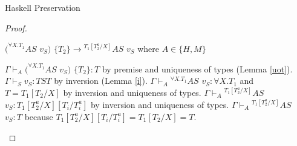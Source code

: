 \begin{theorem}{Haskell Preservation}
\begin{proof}

\begin{case}
$(^{\forall X.T_{1}}AS$ $v_{S})$ $\lbrace T_{2}\rbrace\rightarrow{^{T_{1}[T_{2}^{a}/X]}A}S$ $v_{S}$ where $A\in\lbrace H,M\rbrace$

$\Gamma\vdash_{A}(^{\forall X.T_{1}}AS$ $v_{S})$ $\lbrace T_{2}\rbrace:T$ by premise and uniqueness of types (Lemma \ref{uot}).  $\Gamma\vdash_{S}v_{S}:TST$ by inversion (Lemma \ref{i}).  $\Gamma\vdash_{A}{^{\forall X.T_{1}}A}S$ $v_{S}:\forall X.T_{1}$ and $T=T_{1}[T_{2}/X]$ by inversion and uniqueness of types.  $\Gamma\vdash_{A}{^{T_{1}[T_{2}^{a}/X]}A}S$ $v_{S}:T_{1}[T_{2}^{a}/X][T_{i}/T_{i}^{a}]$ by inversion and uniqueness of types.  $\Gamma\vdash_{A}{^{T_{1}[T_{2}^{a}/X]}A}S$ $v_{S}:T$ because $T_{1}[T_{2}^{a}/X][T_{i}/T_{i}^{a}]=T_{1}[T_{2}/X]=T$.
\end{case}

\end{proof}

\end{theorem}
